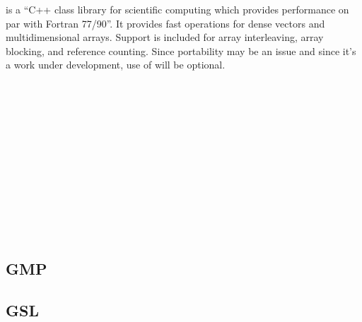  is a ``C++ class library for scientific computing which
provides performance on par with Fortran 77/90''.  It provides fast
operations for dense vectors and multidimensional arrays.  Support
is included for array interleaving, array blocking, and reference counting.
Since portability may be an issue and since it's a work under development, 
use of  will be optional.

\subsection{\useno\ } 
\subsection{\usemaybe\ }  
\subsection{\useno\ }    
\subsection{\useno\ } 
\subsection{GMP}
\subsection{GSL}
\subsection{\usemaybe\ }   
\subsection{\useno\ } 
\subsection{\useyes\ } 
\subsection{\usemaybe\ }  
\subsection{\useyes\ }    
\subsection{\useno\ } 
